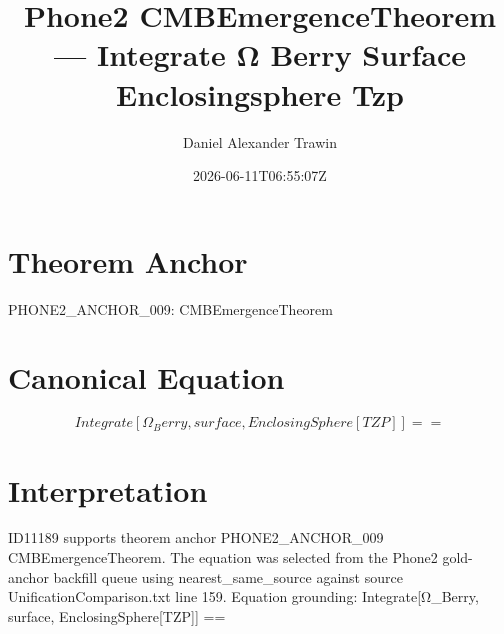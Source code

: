 \documentclass[11pt]{article}
\title{Phone2 CMBEmergenceTheorem — Integrate Ω Berry Surface Enclosingsphere Tzp}
\author{Daniel Alexander Trawin}
\date{2026-06-11T06:55:07Z}
\begin{document}
\maketitle
\section*{Theorem Anchor}
PHONE2_ANCHOR_009: CMBEmergenceTheorem
\section*{Canonical Equation}
\[
Integrate[Ω_Berry, {surface, EnclosingSphere[TZP]}] ==
\]
\section*{Interpretation}
ID11189 supports theorem anchor PHONE2_ANCHOR_009 CMBEmergenceTheorem. The equation was selected from the Phone2 gold-anchor backfill queue using nearest_same_source against source UnificationComparison.txt line 159. Equation grounding: Integrate[Ω_Berry, {surface, EnclosingSphere[TZP]}] ==
\end{document}
